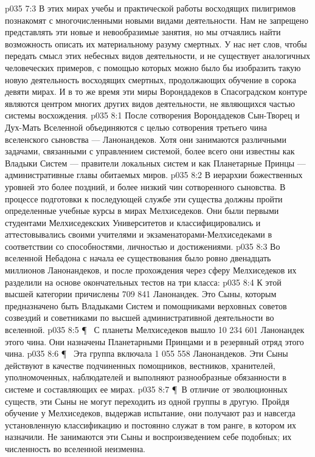 \vs p035 7:3 В этих мирах учебы и практической работы восходящих пилигримов познакомят с многочисленными новыми видами деятельности. Нам не запрещено представлять эти новые и невообразимые занятия, но мы отчаялись найти возможность описать их материальному разуму смертных. У нас нет слов, чтобы передать смысл этих небесных видов деятельности, и не существует аналогичных человеческих примеров, с помощью которых можно было бы изобразить такую новую деятельность восходящих смертных, продолжающих обучение в сорока девяти мирах. И в то же время эти миры Ворондадеков в Спасоградском контуре являются центром многих других видов деятельности, не являющихся частью системы восхождения.
\vs p035 8:1 После сотворения Ворондадеков Сын\hyp{}Творец и Дух\hyp{}Мать Вселенной объединяются с целью сотворения третьего чина вселенского сыновства --- Ланонандеков. Хотя они занимаются различными задачами, связанными с управлением системой, более всего они известны как Владыки Систем --- правители локальных систем и как Планетарные Принцы --- административные главы обитаемых миров.
\vs p035 8:2 В иерархии божественных уровней это более поздний, и более низкий чин сотворенного сыновства. В процессе подготовки к последующей службе эти существа должны пройти определенные учебные курсы в мирах Мелхиседеков. Они были первыми студентами Мелхиседекских Университетов и классифицировались и аттестовывались своими учителями и экзаменаторами\hyp{}Мелхиседеками в соответствии со способностями, личностью и достижениями.
\vs p035 8:3 Во вселенной Небадона с начала ее существования было ровно двенадцать миллионов Ланонандеков, и после прохождения через сферу Мелхиседеков их разделили на основе окончательных тестов на три класса:
\vs p035 8:4 \bibnobreakspace {} К этой высшей категории причислены 709 841 Ланонандек. Это Сыны, которым предназначено быть Владыками Систем и помощниками верховных советов созвездий и советниками по высшей административной деятельности во вселенной.
\vs p035 8:5 \P\ \bibnobreakspace {} С планеты Мелхиседеков вышло 10 234 601 Ланонандек этого чина. Они назначены Планетарными Принцами и в резервный отряд этого чина.
\vs p035 8:6 \P\ \bibnobreakspace {} Эта группа включала 1 055 558 Ланонандеков. Эти Сыны действуют в качестве подчиненных помощников, вестников, хранителей, уполномоченных, наблюдателей и выполняют разнообразные обязанности в системе и составляющих ее мирах.
\vs p035 8:7 \P\ В отличие от эволюционных существ, эти Сыны не могут переходить из одной группы в другую. Пройдя обучение у Мелхиседеков, выдержав испытание, они получают раз и навсегда установленную классификацию и постоянно служат в том ранге, в котором их назначили. Не занимаются эти Сыны и воспроизведением себе подобных; их численность во вселенной неизменна.
